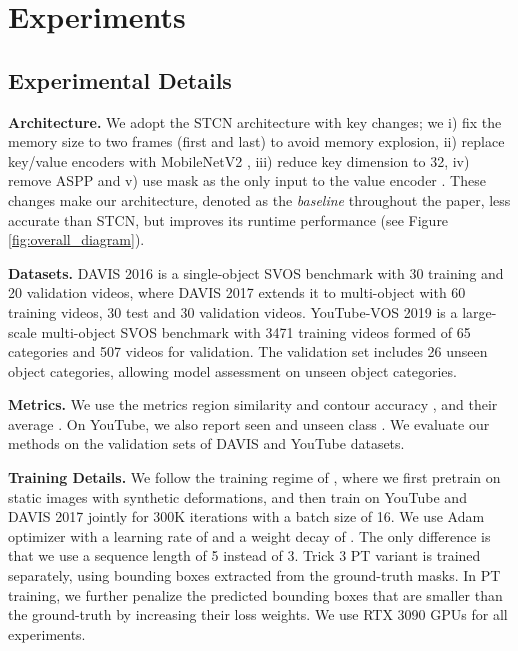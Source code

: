 \section{Experiments} \label{sec:experiments}
\vspace{-3mm}
\subsection{Experimental Details}
\vspace{-2mm}
\noindent \textbf{Architecture.} We adopt the STCN architecture \cite{cheng2021rethinking} with key changes; we i) fix the memory size to two frames (first and last) to avoid memory explosion, ii) replace key/value encoders with MobileNetV2 \cite{sandler2018mobilenetv2}, iii) reduce key dimension to 32, iv) remove ASPP and v) use mask as the only input to the value encoder \cite{miles2023mobilevos}. These changes make our architecture, denoted as the \textit{baseline} throughout the paper, less accurate than STCN, but improves its runtime performance (see Figure \ref{fig:overall_diagram}).

\noindent \textbf{Datasets.} DAVIS 2016 \cite{perazzi2016benchmark} is a single-object SVOS benchmark with 30 training and 20 validation videos, where DAVIS 2017 \cite{pont20172017} extends it to multi-object with 60 training videos, 30 test and 30 validation videos. YouTube-VOS 2019 \cite{xu2018youtube} is a large-scale multi-object SVOS benchmark with 3471 training videos formed of 65 categories and 507 videos for validation. The validation set includes 26 unseen object categories, allowing model assessment on unseen object categories. 

\noindent \textbf{Metrics.} We use the metrics region similarity  and contour accuracy , and their average . On YouTube, we also report seen and unseen class . We evaluate our methods on the validation sets of DAVIS and YouTube datasets.

\noindent \textbf{Training Details.}
We follow the training regime of \cite{cheng2021rethinking}, where we first pretrain on static images with synthetic deformations, and then train on YouTube and DAVIS 2017 jointly for 300K iterations with a batch size of 16. We use Adam optimizer with a learning rate of  and a weight decay of . The only difference is that we use a sequence length of 5 instead of 3. Trick 3 PT variant is trained separately, using bounding boxes extracted from the ground-truth masks. In PT training, we further penalize the predicted bounding boxes that are smaller than the ground-truth by increasing their loss weights. We use RTX 3090 GPUs for all experiments.


